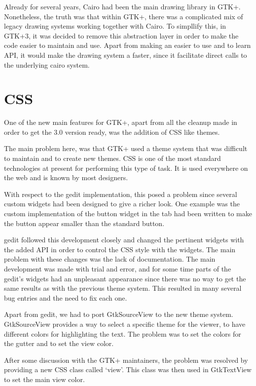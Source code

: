 Already for several years, Cairo had been the main drawing library in GTK+.  Nonetheless, the truth was that 
within GTK+, there was a complicated mix of legacy drawing systems working together with Cairo. 
To simpllify this, in GTK+3, it was decided to remove this abstraction layer in order 
to make the code easier to maintain and use.  Apart from making an easier to use and to learn API, 
it would make the drawing system a faster, since it facilitate direct calls to the underlying cairo system.

\section{CSS}

One of the new main features for GTK+, apart from all the cleanup made in order to get the 3.0 version ready, was the 
addition of CSS like themes.

The main problem here, was that GTK+ used a theme system that was difficult to maintain and to create new themes. CSS is one of the 
most standard technologies at present for performing this type of task. It is used everywhere on the web and is known by most designers. 

With respect to the gedit implementation, this posed a problem since several custom widgets had been designed to give a 
richer look.  One example was the custom implementation of the button widget in the tab had been written to make the button appear 
smaller than the standard button.

gedit followed this development closely and changed the pertinent widgets with the added API in order to control the 
CSS style with the widgets. The main problem with these changes was the lack of documentation. The main development was made with trial 
and error,  and for some time parts of the gedit's widgets had an unpleasant appearance since there was no way to get the same results 
as with the previous theme system. This resulted in many several bug entries and the need to fix each one.

Apart from gedit, we had to port GtkSourceView to the new theme system. GtkSourceView provides a way to select a specific theme for the viewer, to have different colors for highlighting the text. The problem  was to set the colors for the gutter and to set the view color.

After some discussion with the GTK+ maintainers, the problem was resolved by providing a new CSS class called `view'. 
This class was then used in GtkTextView to set the main view color.

